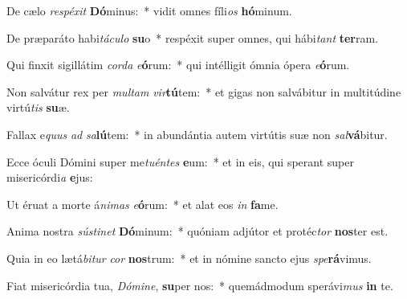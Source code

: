 \item De cælo \textit{re}\textit{spé}\textit{xit} \textbf{Dó}minus:~* vidit omnes fíli\textit{os} \textbf{hó}minum.
\item De præparáto habi\textit{tá}\textit{cu}\textit{lo} \textbf{su}o~* respéxit super omnes, qui hábi\textit{tant} \textbf{ter}ram.
\item Qui finxit sigillátim \textit{cor}\textit{da} \textit{e}\textbf{ó}rum:~* qui intélligit ómnia ópera \textit{e}\textbf{ó}rum.
\item Non salvátur rex per \textit{mul}\textit{tam} \textit{vir}\textbf{tú}tem:~* et gigas non salvábitur in multitúdine virtú\textit{tis} \textbf{su}æ.
\item Fallax e\textit{quus} \textit{ad} \textit{sa}\textbf{lú}tem:~* in abundántia autem virtútis suæ non \textit{sal}\textbf{vá}bitur.
\item Ecce óculi Dómini super me\textit{tu}\textit{én}\textit{tes} \textbf{e}um:~* et in eis, qui sperant super misericórdi\textit{a} \textbf{e}jus:
\item Ut éruat a morte á\textit{ni}\textit{mas} \textit{e}\textbf{ó}rum:~* et alat eos \textit{in} \textbf{fa}me.
\item Anima nostra \textit{sús}\textit{ti}\textit{net} \textbf{Dó}minum:~* quóniam adjútor et protéc\textit{tor} \textbf{nos}ter est.
\item Quia in eo lætá\textit{bi}\textit{tur} \textit{cor} \textbf{nos}trum:~* et in nómine sancto ejus \textit{spe}\textbf{rá}vimus.
\item Fiat misericórdia tua, \textit{Dó}\textit{mi}\textit{ne}, \textbf{su}per nos:~* quemádmodum sperávi\textit{mus} \textbf{in} te.
